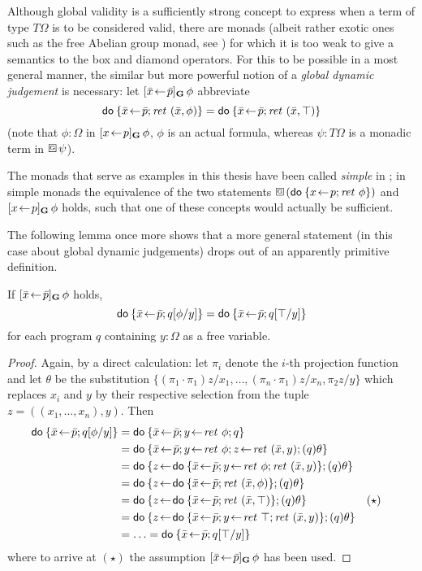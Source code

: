 Although global validity is a sufficiently strong concept to express when a term
of type $T\Omega$ is to be considered valid, there are monads (albeit rather exotic
ones such as the free Abelian group monad, see \cite[Section
3]{SchroederMossakowski:PDL}) for which it is too weak to give a semantics to
the box and diamond operators. For this to be possible in a most general manner,
the similar but more powerful notion of a \emph{global dynamic judgement} is
necessary: let $[\bar x\!\gets\! \bar p]_\mathbf{G}\,\phi$ abbreviate
\[ \mathsf{do}\: \{\bar x\!\gets\! \bar p; \mathit{ret}~(\bar x, \phi)\} = \mathsf{do}\: \{\bar x\!\gets\! \bar p; \mathit{ret}~(\bar
  x, \top)\} \]
(note that $\phi : \Omega$ in $[x\!\gets\! p]_\mathbf{G}\,\phi$, \IE $\phi$ is an actual formula,
whereas $\psi : T \Omega$ is a monadic term in $\gbox \psi$). 
\begin{rem} \label{rem:simple-monads}
  The monads that serve as examples in this thesis have been called \emph{simple}
  in \cite{SchroederMossakowski:PDL}; in simple monads the equivalence of the
  two statements $\gbox (\DoStmt{x\leteq p; \ret~\phi})$ and $[x\!\gets\! p]_\mathbf{G}\,\phi$
  holds, such that one of these concepts would actually be sufficient. 
\end{rem}

The following lemma once more shows that a more general statement (in this case
about global dynamic judgements) drops out of an apparently primitive definition.
\begin{lem}
  \label{thm:gdj-general}
  If $[\bar x\!\gets\! \bar p]_\mathbf{G}\,\phi$ holds, 
  \[ \mathsf{do}\: \{\bar x\!\gets\! \bar p; q[\phi/y]\} = \mathsf{do}\: \{\bar x\!\gets\! \bar p; q[\top/y]\}
  \]
  for each program $q$ containing $y : \Omega$ as a free variable.
\end{lem}
\begin{proof}
  Again, by a direct calculation: let $\pi_i$ denote the $i$-th projection
  function and let $\theta$ be the substitution $\{(\pi_1\cdot \pi_1)z/x_1, \ldots, (\pi_n\cdot
  \pi_1)z/x_n, \pi_2z/y\}$ which replaces $x_i$ and $y$ by their respective selection
  from the tuple $z= ((x_1,\ldots,x_n), y)$. Then
  \begin{align*}
       \DoStmt{\bar x\leteq \bar p; q[\phi/y]} &= 
       \DoStmt{\bar x\leteq \bar p; y\leteq \ret~\phi; q} \\
    &= \DoStmt{\bar x\leteq \bar p; y\leteq \ret~\phi; z\leteq \ret~(\bar x, y);
      (q)\theta} \\
    &= \DoStmt{z\leteq\DoStmt{\bar x\leteq \bar p; y\leteq \ret~\phi; \ret~(\bar x,
        y)}; (q)\theta}\\
    &= \DoStmt{z\leteq\DoStmt{\bar x\leteq\bar p; \ret~(\bar x, \phi)}; (q)\theta}\\
    &= \DoStmt{z\leteq\DoStmt{\bar x\leteq\bar p; \ret~(\bar x, \top)}; (q)\theta} &&(\star)\\
    &= \DoStmt{z\leteq\DoStmt{\bar x\leteq\bar p; y\leteq \ret~\top; \ret~(\bar x,
        y)}; (q)\theta}\\
    &= \ldots = \DoStmt{\bar x\leteq \bar p; q[\top/y]}
  \end{align*}
  where to arrive at $(\star)$ the assumption  $[\bar x\!\gets\! \bar p]_\mathbf{G}\,\phi$ has
  been used.
\end{proof}

